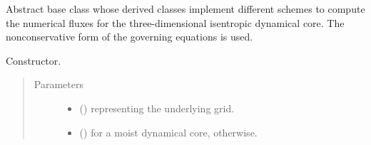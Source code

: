 \documentclass[letterpaper,10pt,english]{sphinxmanual}
\begin{document}
\begin{fulllineitems}
\label{\detokenize{api:dycore.flux_isentropic_nonconservative.FluxIsentropicNonconservative}}
Abstract base class whose derived classes implement different schemes to compute the numerical fluxes for
the three-dimensional isentropic dynamical core. The nonconservative form of the governing equations is used.

\begin{fulllineitems}
\label{\detokenize{api:dycore.flux_isentropic_nonconservative.FluxIsentropicNonconservative.__init__}}
Constructor.
\begin{quote}\begin{description}
\item[{Parameters}] \leavevmode\begin{itemize}
\item {} 
 () \textendash{} {\hyperref[\detokenize{api:grids.grid_xyz.GridXYZ}]{}} representing the underlying grid.

\item {} 
 () \textendash{}  for a moist dynamical core,  otherwise.

\end{itemize}

\end{description}\end{quote}

\end{fulllineitems}



\end{fulllineitems}
\end{document}
